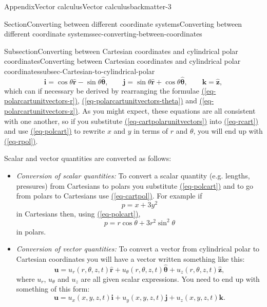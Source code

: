 \documentclass[oneside,10pt,]{book}
\newcommand{\xreffont}{\relax}
\newcommand{\ptxlistdisc}{\raisebox{0.3ex}{\textbullet}}
\numberwithin{equation}{section}
\newcommand{\bu}{\boldsymbol{u}}
\begin{document}
\begin{appendixptx}{Appendix}{Vector calculus}{}{Vector calculus}{}{}{backmatter-3}
\begin{sectionptx}{Section}{Converting between different coordinate systems}{}{Converting between different coordinate systems}{}{}{sec-converting-between-coordinates}
\begin{subsectionptx}{Subsection}{Converting between Cartesian coordinates and cylindrical polar coordinates}{}{Converting between Cartesian coordinates and cylindrical polar coordinates}{}{}{subsec-Cartesian-to-cylindrical-polar}
\begin{equation}
\boldsymbol{i}=\cos\theta\hat{\boldsymbol{r}}-\sin\theta\hat{\boldsymbol{\theta}},
\qquad
\boldsymbol{j}=\sin\theta\hat{\boldsymbol{r}}+\cos\theta\hat{\boldsymbol{\theta}},
\qquad
\boldsymbol{k}=\hat{\boldsymbol{z}},\label{eq-cartpolarunitvectors}
\end{equation}
which can if necessary be derived by rearranging the formulae \hyperref[eq-polarcartunitvectors-r]{({\xreffont\ref{eq-polarcartunitvectors-r}})}, \hyperref[eq-polarcartunitvectors-theta]{({\xreffont\ref{eq-polarcartunitvectors-theta}})} and \hyperref[eq-polarcartunitvectors-z]{({\xreffont\ref{eq-polarcartunitvectors-z}})}. As you might expect, these equations are all consistent with one another, so if you substitute \hyperref[eq-cartpolarunitvectors]{({\xreffont\ref{eq-cartpolarunitvectors}})} into \hyperref[eq-rcart]{({\xreffont\ref{eq-rcart}})} and use \hyperref[eq-polcart]{({\xreffont\ref{eq-polcart}})} to rewrite \(x\) and \(y\) in terms of \(r\) and \(\theta\), you will end up with \hyperref[eq-rpol]{({\xreffont\ref{eq-rpol}})}.%
\par
Scalar and vector quantities are converted as follows:%
\begin{itemize}[label=\ptxlistdisc]
\item{}\emph{Conversion of scalar quantities:} To convert a scalar quantity (e.g. lengths, pressures) from Cartesians to polars you substitute \hyperref[eq-polcart]{({\xreffont\ref{eq-polcart}})} and to go from polars to Cartesians use \hyperref[eq-cartpol]{({\xreffont\ref{eq-cartpol}})}. For example if%
\begin{equation*}
p=x+3y^2
\end{equation*}
in Cartesians then, using \hyperref[eq-polcart]{({\xreffont\ref{eq-polcart}})},%
\begin{equation*}
p=r\cos\theta+3r^2\sin^2\theta
\end{equation*}
in polars.%
\item{}\emph{Conversion of vector quantities:} To convert a vector from cylindrical polar to Cartesian coordinates you will have a vector written something like this:%
\begin{equation}
\bu=
u_r(r,\theta,z,t)\hat{\boldsymbol{r}}
+u_\theta(r,\theta,z,t)\hat{\boldsymbol{\theta}}
+u_z(r,\theta,z,t)\hat{\boldsymbol{z}},\label{eq-upolar}
\end{equation}
where \(u_r\), \(u_\theta\) and \(u_z\) are all given scalar expressions. You need to end up with something of this form:%
\begin{equation}
\bu=u_x(x,y,z,t)\boldsymbol{i}+u_y(x,y,z,t)\boldsymbol{j}+u_z(x,y,z,t)\boldsymbol{k}.\label{eq-ucart}

\end{equation}
\end{itemize}
\end{subsectionptx}
\end{sectionptx}
\end{appendixptx}
\end{document}
